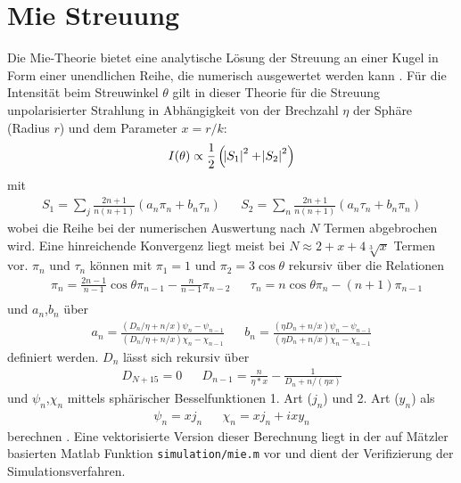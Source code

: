 \section{Mie Streuung}
Die Mie-Theorie bietet eine analytische Lösung der Streuung an einer Kugel  in Form einer unendlichen Reihe, die numerisch ausgewertet werden kann \cite{bohren2008}. Für die Intensität beim Streuwinkel $\theta$ gilt in dieser Theorie für die Streuung unpolarisierter Strahlung in Abhängigkeit von der Brechzahl $\eta$ der Sphäre (Radius $r$) und dem Parameter $x=r/k$:
\begin{equation}
I(\theta)\propto\frac{1}{2}\left(\abs{S_1}^2+\abs{S_2}^2\right)
\end{equation} 
mit
\begin{align}
S_1=\sum_j{\frac{2n+1}{n(n+1)}(a_n\pi_n+b_n\tau_n)} &&S_2=\sum_n{\frac{2n+1}{n(n+1)}(a_n\tau_n+b_n\pi_n)}
\end{align}
wobei die Reihe bei der numerischen Auswertung nach $N$ Termen abgebrochen wird. Eine hinreichende Konvergenz liegt meist bei $N\approx2+x+4\sqrt[3]{x}$ Termen vor.  $\pi_n$ und $\tau_n$ können mit $\pi_1=1$ und  $\pi_2=3\cos{\theta}$ rekursiv über die Relationen
\begin{align}
&\pi_n=\frac{2n-1}{n-1}\cos{\theta}\pi_{n-1}-\frac{n}{n-1}\pi_{n-2}&&\tau_n=n\cos{\theta}\pi_n-(n+1)\pi_{n-1}\\
\end{align}
und $a_n$,$b_n$ über 
\begin{align}
a_n=\frac{(D_n/\eta+n/x)\psi_n-\psi_{n-1}}{(D_n/\eta+n/x)\chi_n-\chi_{n-1}} &&
b_n=\frac{(\eta D_n+n/x)\psi_n-\psi_{n-1}}{(\eta D_n+n/x)\chi_n-\chi_{n-1}}
\end{align} definiert werden. $D_n$ lässt sich rekursiv über
\begin{align}
D_{N+15}=0 && D_{n-1}=\frac{n}{\eta*x}-\frac{1}{D_n+n/(\eta x)}
\end{align}
und $\psi_n$,$\chi_n$ mittels sphärischer Besselfunktionen 1. Art ($j_n$) und 2. Art ($y_n$) als 
\begin{align}
  \psi_n=x j_n&&  \chi_n=x j_n+ixy_n
\end{align}
berechnen \cite[S. 112f, 95, 127f]{bohren2008}.
Eine vektorisierte Version dieser Berechnung liegt in der auf Mätzler \cite{maetzler2002} basierten Matlab Funktion \texttt{simulation/mie.m} vor und dient der Verifizierung der Simulationsverfahren.
